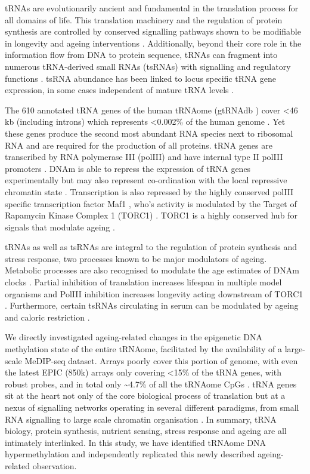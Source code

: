 \documentclass[]{book}
\begin{document}
tRNAs are evolutionarily ancient \citep{Eigen1989} and fundamental in the translation process for all domains of life.
This translation machinery and the regulation of protein synthesis are controlled by conserved signalling pathways shown to be modifiable in longevity and ageing interventions \citep{Tavernarakis2008}.
Additionally, beyond their core role in the information flow from DNA to protein sequence, tRNAs can fragment into numerous tRNA-derived small RNAs (tsRNAs) \citep{Pliatsika2018} with signalling and regulatory functions \citep{Schimmel2017, Lee2009, Li2018a, Xu2017a}.
tsRNA abundance has been linked to locus specific tRNA gene expression, in some cases independent of mature tRNA levels \citep{Torres2019}.

The 610 annotated tRNA genes of the human tRNAome (gtRNAdb \citep{Chan2009}) cover \textless46 kb (including introns) which represents \textless0.002\% of the human genome \citep{Parisien2013}.
Yet these genes produce the second most abundant RNA species next to ribosomal RNA \citep{Lodish2000} and are required for the production of all proteins.
tRNA genes are transcribed by RNA polymerase III (polIII) \citep{Schramm2002} and have internal type II polIII promoters \citep{Canella2010}.
DNAm is able to repress the expression of tRNA genes experimentally \citep{Besser1990} but may also represent co-ordination with the local repressive chromatin state \citep{Varshney2015}.
Transcription is also repressed by the highly conserved polIII specific transcription factor Maf1 \citep{Murawski1994, Pluta2001}, who's activity is modulated by the Target of Rapamycin Kinase Complex 1 (TORC1) \citep{Mange2017}.
TORC1 is a highly conserved hub for signals that modulate ageing \citep{Kennedy2016}.

tRNAs as well as tsRNAs are integral to the regulation of protein synthesis and stress response, two processes known to be major modulators of ageing.
Metabolic processes are also recognised to modulate the age estimates of DNAm clocks \citep{Nwanaji-Enwerem2018}.
Partial inhibition of translation increases lifespan in multiple model organisms \citep{Hansen2007} and PolIII inhibition increases longevity acting downstream of TORC1 \citep{Filer2017}.
Furthermore, certain tsRNAs circulating in serum can be modulated by ageing and caloric restriction \citep{Dhahbi2013}.

We directly investigated ageing-related changes in the epigenetic DNA methylation state of the entire tRNAome, facilitated by the availability of a large-scale MeDIP-seq dataset.
Arrays poorly cover this portion of genome, with even the latest EPIC (850k) arrays only covering \textless15\% of the tRNA genes, with robust probes, and in total only \textasciitilde4.7\% of all the tRNAome CpGs \citep{Zhou2017}.
tRNA genes sit at the heart not only of the core biological process of translation but at a nexus of signalling networks operating in several different paradigms, from small RNA signalling to large scale chromatin organisation \citep{VanBortle2017}.
In summary, tRNA biology, protein synthesis, nutrient sensing, stress response and ageing are all intimately interlinked.
In this study, we have identified tRNAome DNA hypermethylation and independently replicated this newly described ageing-related observation.
\end{document}
